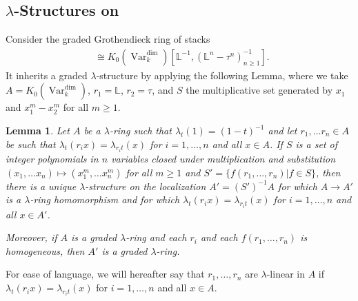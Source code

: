 \documentclass{amsart}
\newtheorem{lem}[thm]{Lemma}
\theoremstyle{definition}
\DeclareMathOperator{\Var}{Var}
\DeclareMathOperator{\Stk}{Stk}
\newcommand{\Kdim}{K_0(\Var_k^{\dim})}
\DeclareMathOperator{\Kstk}{K_0(\Stk_k^{\dim})}
\numberwithin{equation}{section}
\begin{document}
\subsection{$\lambda$-Structures on $\Kstk$}
Consider the graded Grothendieck ring of stacks
\begin{align*}
    \Kstk \cong \Kdim[\mathbb{L}^{-1}, (\mathbb{L}^n-\tau^n)^{-1}_{n \geq 1}].
\end{align*} 
It inherits a graded $\lambda$-structure by applying the following Lemma, where we take $A = \Kdim$, $r_1 = \mathbb{L}$, $r_2 = \tau$, and $S$ the multiplicative set generated by $x_1$ and $x_1^m - x_2^m$ for all $m \geq 1$.

\begin{lem}\label{lambda ext}
Let $A$ be a $\lambda$-ring such that $\lambda_t(1) = (1-t)^{-1}$ and let $r_1, \ldots r_n \in A$ be such that $\lambda_t(r_ix) = \lambda_{r_it}(x)$ for $i = 1, \ldots , n$ and all $x \in A$. If $S$ is a set of integer polynomials in $n$ variables closed under multiplication and substitution $(x_1, \ldots x_n) \mapsto (x_1^m, \ldots x_n^m)$ for all $m \geq 1$ and $S' = \{ f(r_1, \ldots , r_n) | f \in S \}$, then there is a unique $\lambda$-structure on the localization $A' = (S')^{-1}A$ for which $A \rightarrow A'$ is a $\lambda$-ring homomorphism and for which $\lambda_t(r_i x) = \lambda_{r_i t}(x)$ for $i = 1, \ldots , n$ and all $x \in A'$.

Moreover, if $A$ is a graded $\lambda$-ring and each $r_i$ and each $f(r_1, \ldots , r_n)$ is homogeneous, then $A'$ is a graded $\lambda$-ring.
\end{lem}

For ease of language, we will hereafter say that $r_1, \ldots , r_n$ are $\lambda$-linear in $A$ if $\lambda_t(r_i x) = \lambda_{r_i t}(x)$ for $i = 1, \ldots , n$ and all $x \in A$.
\end{document}
